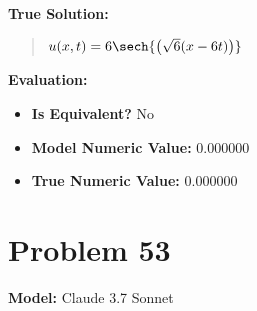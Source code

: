 \documentclass{article}
\begin{document}
\textbf{True Solution:}
\begin{quote}
$u(x,t) = 6 \sech{\left( \sqrt{6} (x - 6t) \right)}$
\end{quote}

\textbf{Evaluation:}
\begin{itemize}
\item \textbf{Is Equivalent?} No
\item \textbf{Model Numeric Value:} 0.000000
\item \textbf{True Numeric Value:} 0.000000
\end{itemize}
\vspace{1cm}
\section*{Problem 53}
\textbf{Model:} Claude 3.7 Sonnet
\end{document}
